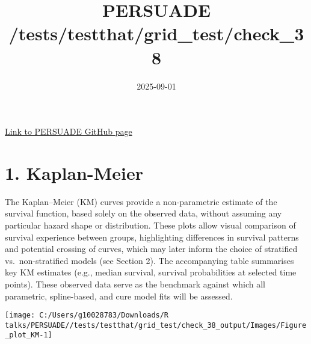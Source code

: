 \documentclass[
]{article}
\title{PERSUADE /tests/testthat/grid\_test/check\_38}
\author{}
\date{\vspace{-2.5em}2025-09-01}
\begin{document}
\maketitle

{
\hypersetup{linkcolor=}
\setcounter{tocdepth}{2}
\tableofcontents
}
\hfill\break

\href{https://github.com/Bram-R/PERSUADE}{Link to PERSUADE GitHub page}

\clearpage

\section{1. Kaplan-Meier}\label{kaplan-meier}

The Kaplan--Meier (KM) curves provide a non-parametric estimate of the
survival function, based solely on the observed data, without assuming
any particular hazard shape or distribution. These plots allow visual
comparison of survival experience between groups, highlighting
differences in survival patterns and potential crossing of curves, which
may later inform the choice of stratified vs.~non-stratified models (see
Section 2). The accompanying table summarises key KM estimates (e.g.,
median survival, survival probabilities at selected time points). These
observed data serve as the benchmark against which all parametric,
spline-based, and cure model fits will be assessed.

\clearpage

\begin{flushleft}\texttt{[image: C:/Users/g10028783/Downloads/R talks/PERSUADE//tests/testthat/grid\_test/check\_38\_output/Images/Figure\_plot\_KM-1]} \end{flushleft}

\begin{table}[H]
\centering
\caption{\label{tab:Table_1}Observed survival data}
\centering
{}
\end{table}
\end{document}
